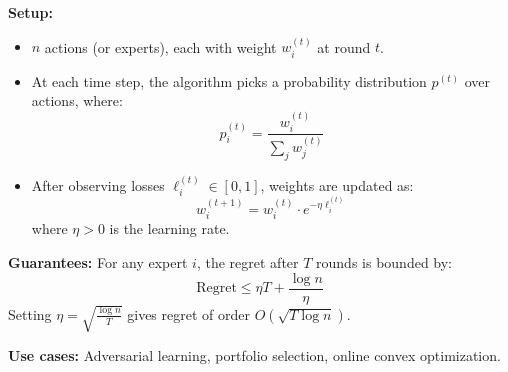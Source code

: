 \documentclass[a4paper,landscape]{article}
\begin{document}
\begin{multicols}{7}
\textbf{Setup:}
\begin{itemize}[noitemsep, topsep=0pt]
    \item $n$ actions (or experts), each with weight $w_i^{(t)}$ at round $t$.
    \item At each time step, the algorithm picks a probability distribution $p^{(t)}$ over actions, where:
    \[
    p_i^{(t)} = \frac{w_i^{(t)}}{\sum_j w_j^{(t)}}
    \]
    \item After observing losses $\ell_i^{(t)} \in [0,1]$, weights are updated as:
    \[
    w_i^{(t+1)} = w_i^{(t)} \cdot e^{-\eta \ell_i^{(t)}}
    \]
    where $\eta > 0$ is the learning rate.
\end{itemize}


\textbf{Guarantees:}  
For any expert $i$, the regret after $T$ rounds is bounded by:
\[
\text{Regret} \leq \eta T + \frac{\log n}{\eta}
\]
Setting $\eta = \sqrt{\frac{\log n}{T}}$ gives regret of order $O(\sqrt{T \log n})$.


\textbf{Use cases:} Adversarial learning, portfolio selection, online convex optimization.
\endtcolorbox


\end{multicols}
\end{document}
